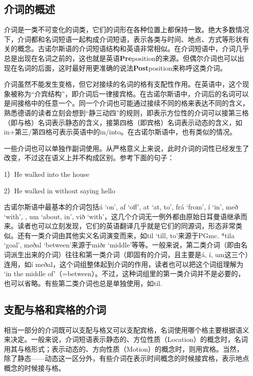 {{\subsection{介词的概述}\label{介词的概述}

介词是一类不可变化的词类，它们的词形在各种位置上都保持一致。绝大多数情况下，介词都和名词短语一起构成介词短语，表示各类与时间、地点、方式等形状有关的概念。古诺尔斯语的介词短语结构和英语非常相似。在介词短语中，介词几乎总是出现在名词之前的，这也就是英语\textbf{Pre}position的来源。但偶尔介词也可以出现在名词的后面，这时最好用更准确的说法\textbf{Post}position来称呼这类介词。

介词虽然不能发生变格，但它对接续的名词的格有支配性作用。在英语中，这个现象被称为``介宾结构''，即介词后一律接宾格。在古诺尔斯语中，介词后的名词可以是间接格中的任意一个。同一个介词也可能通过接续不同的格来表达不同的含义，熟悉德语的读者立刻会想到``静三动四''的规则，即表示方位性的介词可以接第三格（即与格）名词表示静态的含义，接第四格（即宾格）名词表示动态的含义，如in+第三/第四格可表示英语中的in/into。在古诺尔斯语中，也有类似的情况。

一些介词也可以单独作副词使用。从严格意义上来说，此时介词的词性已经发生了改变，不过这在语义上并不构成区别。参考下面的句子：

1）He walked into the house

2）He walked in without saying hello

古诺尔斯语中最基本的介词包括á `on', af `off', at `at, to', frá `from', í
`in', með `with', , um `about, in', við
`with'，这几个介词无一例外都由原始日耳曼语继承而来。读者也可以立刻发现，它们的英语翻译几乎就是它们的同源词，形态非常类似。还有一类介词由其他实义名词演变而来，如til
`till, to'来源于PGmc. *tila `goal', meðal `between'来源于miðr
`middle'等等。一般来说，第二类介词（即由名词派生出来的介词）往往和第一类介词（即固有的介词，且主要是á,
í, um这三个）连用，如í
meðal，这个词组整体起到介词的作用，读者也可以把这个词组理解为 `in the
middle
of'（=between）。不过，这种词组里的第一类介词并不是必要的，也可以省略。有些第二类介词也总是单独使用，如til.

\subsection{支配与格和宾格的介词}\label{支配与格和宾格的介词}

相当一部分的介词既可以支配与格又可以支配宾格，名词使用哪个格主要根据语义来决定。一般来说，介词短语表示静态的、方位性质（Location）的概念时，名词用其与格形式；表示动态的、方向性质（Motion）的概念时，则用宾格。当然，除了静态------动态这一区分外，有些介词在表示时间概念的时候接宾格，表示地点概念的时候接与格。

}}
